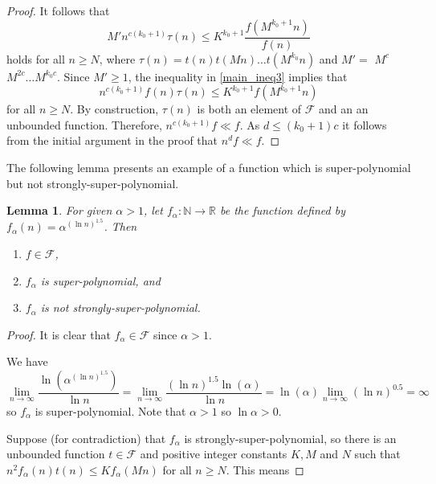 \documentclass[11pt]{amsart}
\newtheorem{lemma}[theorem]{Lemma}
\theoremstyle{definition}
\newcommand\N{\mathbb N}
\newcommand\R{\mathbb R}
\newcommand\F{\mathcal F}
\renewcommand{\geq}{\geqslant} \renewcommand{\leq}{\leqslant} \renewcommand{\ge}{\geqslant} \renewcommand{\le}{\leqslant}
\begin{document}
\begin{appendix}
\begin{proof}
   It follows that
    \begin{equation}
    \label{main_ineq3}
       M' n^{c (k_0+1)}  \tau (n) \leqslant K ^{k_0 +1}
       \frac{f(M^{k_0+1}n)}{f(n)}
    \end{equation}
 holds for all $n \geqslant N$, where
 $\tau (n) = t(n) t(Mn)\dots t(M^{k_0}n)$ and
 $M' =$  $M^{c}$  $M^{2c} \dots M^{k_0 c}$.
 Since $M' \geqslant 1$, the inequality in \eqref{main_ineq3}
 implies that
 \begin{equation}
 \label{final_ineq}
    n^{c (k_0 +1)} f(n) \tau (n) \leqslant
    K^{k_0+1} f(M^{k_0 + 1}n)
 \end{equation}
 for all $n \geqslant N$. By construction, $\tau(n)$ is both an element of ${\mathcal F}$ and an
 an unbounded function.
 Therefore, $n^{c (k_0 + 1)} f \ll f$.
 As $d \leq (k_0+1)c$ it follows from the initial argument in the proof that $n^{d} f \ll f$.
\end{proof}

The following lemma presents an example of  a function which is super-polynomial
but not  strongly-super-polynomial.

\begin{lemma} \label{lem:NotStrongSuperP}
For given $\alpha > 1$, let $f_{\alpha}:\N\to\R $ be the function  defined by $f_{\alpha}(n)= \alpha^{(\ln n)^{1.5} }$. Then \begin{enumerate}
\item $f\in \F$,
\item $f_\alpha$ is super-polynomial, and
\item $f_\alpha$ is not strongly-super-polynomial.  	
\end{enumerate}
\end{lemma}	

\begin{proof}
It is clear that $ f_{\alpha}\in \F$ since $\alpha>1$.

We have \[ \lim_{n \to \infty} \frac{\ln (\alpha^{(\ln n)^{1.5}})}{\ln n}
=\lim_{n \to \infty} \frac{(\ln n)^{1.5}\ln (\alpha)}{\ln n}
=\ln (\alpha)\lim_{n \to \infty} (\ln n)^{0.5}=\infty
\]
so $f_{\alpha}$ is
   super-polynomial. Note that $\alpha>1$ so $\ln \alpha>0$.



   Suppose (for contradiction) that
$f_{\alpha}$ is strongly-super-polynomial, so  there is an unbounded
   function $t \in \mathcal{F}$ and positive integer constants $K,M$ and $N$
   such that $n^2 f_{\alpha}(n) t(n) \leq K f_{\alpha}(Mn)$
   for all $n \geq N$. This means





\end{proof}
\end{appendix}
\end{document}
